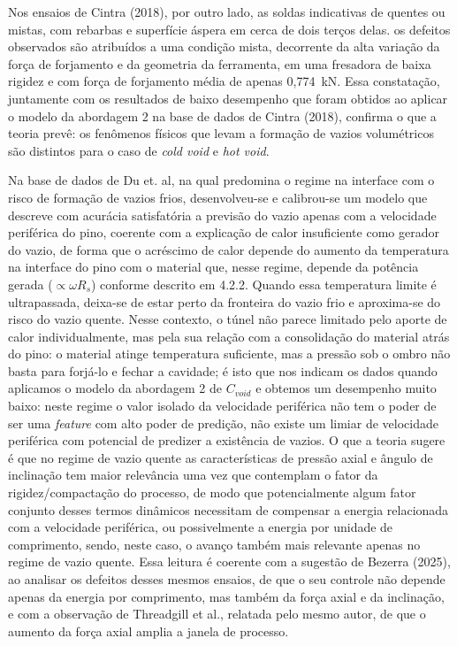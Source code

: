 \documentclass[12pt,openany]{report}
\begin{document}
Nos ensaios de Cintra (2018), por outro lado, as soldas indicativas de quentes ou mistas, com rebarbas e superfície áspera em cerca de dois terços delas. os defeitos observados são atribuídos a uma condição mista, decorrente da alta variação da força de forjamento e da geometria da ferramenta, em uma fresadora de baixa rigidez e com força de forjamento média de apenas 0,774~kN. Essa constatação, juntamente com os resultados de baixo desempenho que foram obtidos ao aplicar o modelo da abordagem 2 na base de dados de Cintra (2018), confirma o que a teoria prevê: os fenômenos físicos que levam a formação de vazios volumétricos são distintos para o caso de \textit{cold void} e \textit{hot void}. 

Na base de dados de Du et. al, na qual predomina o regime na interface com o risco de formação de vazios frios, desenvolveu-se e calibrou-se um modelo que descreve com acurácia satisfatória a previsão do vazio apenas com a velocidade periférica do pino, coerente com a explicação de calor insuficiente como gerador do vazio, de forma que o acréscimo de calor depende do aumento da temperatura na interface do pino com o material que, nesse regime, depende da potência gerada ($\propto \omega R_s$) conforme descrito em 4.2.2. Quando essa temperatura limite é ultrapassada, deixa-se de estar perto da fronteira do vazio frio e aproxima-se do risco do vazio quente. Nesse contexto, o túnel não parece limitado pelo aporte de calor individualmente, mas pela sua relação com a consolidação do material atrás do pino: o material atinge temperatura suficiente, mas a pressão sob o ombro não basta para forjá-lo e fechar a cavidade; é isto que nos indicam os dados quando aplicamos o modelo da abordagem 2 de $C_{void}$ e obtemos um desempenho muito baixo: neste regime o valor isolado da velocidade periférica não tem o poder de ser uma \textit{feature} com alto poder de predição, não existe um limiar de velocidade periférica com potencial de predizer a existência de vazios. O que a teoria sugere é que no regime de vazio quente as características de pressão axial e ângulo de inclinação tem maior relevância uma vez que contemplam o fator da rigidez/compactação do processo, de modo que potencialmente algum fator conjunto desses termos dinâmicos necessitam de compensar a energia relacionada com a velocidade periférica, ou possivelmente a energia por unidade de comprimento, sendo, neste caso, o avanço também mais relevante apenas no regime de vazio quente. Essa leitura é coerente com a sugestão de Bezerra (2025), ao analisar os defeitos desses mesmos ensaios, de que o seu controle não depende apenas da energia por comprimento, mas também da força axial e da inclinação, e com a observação de Threadgill et al., relatada pelo mesmo autor, de que o aumento da força axial amplia a janela de processo.
\end{document}
